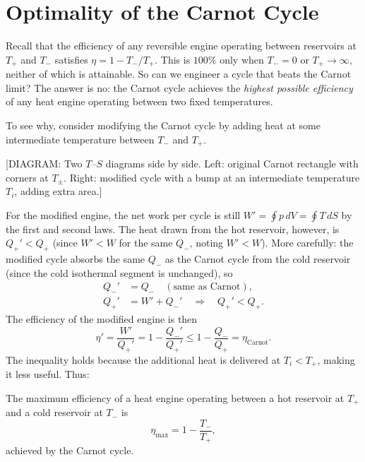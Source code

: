 
\section{Optimality of the Carnot Cycle}

Recall that the efficiency of any reversible engine operating between reservoirs at $T_+$ and $T_-$ satisfies $\eta = 1 - T_-/T_+$. This is $100\%$ only when $T_- = 0$ or $T_+ \to \infty$, neither of which is attainable. So can we engineer a cycle that beats the Carnot limit? The answer is no: the Carnot cycle achieves the \emph{highest possible efficiency} of any heat engine operating between two fixed temperatures.

To see why, consider modifying the Carnot cycle by adding heat at some intermediate temperature between $T_-$ and $T_+$.

\begin{center}[DIAGRAM: Two $T$--$S$ diagrams side by side. Left: original Carnot rectangle with corners at $T_\pm$. Right: modified cycle with a bump at an intermediate temperature $T_i$, adding extra area.]\end{center}

For the modified engine, the net work per cycle is still $W' = \oint p\,dV = \oint T\,dS$ by the first and second laws. The heat drawn from the hot reservoir, however, is $Q_+' < Q_+$ (since $W' < W$ for the same $Q_-$, noting $W' < W$). More carefully: the modified cycle absorbs the same $Q_-$ as the Carnot cycle from the cold reservoir (since the cold isothermal segment is unchanged), so
\begin{align}
    Q_-' &= Q_- \quad (\text{same as Carnot}), \\
    Q_+' &= W' + Q_-' \quad \Rightarrow \quad Q_+' < Q_+.
\end{align}
The efficiency of the modified engine is then
\begin{equation}
    \eta' = \frac{W'}{Q_+'} = 1 - \frac{Q_-'}{Q_+'} \leq 1 - \frac{Q_-}{Q_+} = \eta_{\text{Carnot}}.
\end{equation}
The inequality holds because the additional heat is delivered at $T_i < T_+$, making it less useful. Thus:

\begin{theorem}
The maximum efficiency of a heat engine operating between a hot reservoir at $T_+$ and a cold reservoir at $T_-$ is
\begin{equation}
    \eta_{\max} = 1 - \frac{T_-}{T_+},
\end{equation}
achieved by the Carnot cycle.
\end{theorem}

